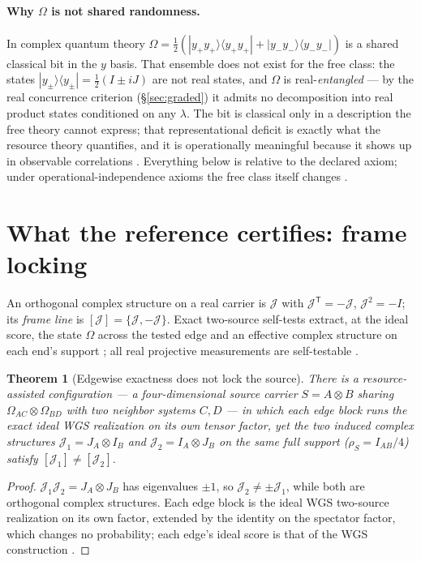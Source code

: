 \documentclass[11pt]{article}
\theoremstyle{plain}
\newtheorem{theorem}{Theorem}[section]
\theoremstyle{definition}
\theoremstyle{remark}
\theoremstyle{plain}
\newcommand{\Om}{\Omega}
\newcommand{\cJ}{\mathcal{J}}
\begin{document}
\paragraph{Why $\Om$ is not shared randomness.} In complex quantum
theory $\Om = \tfrac12(|y_+y_+\rangle\langle y_+y_+| +
|y_-y_-\rangle\langle y_-y_-|)$ is a shared classical bit in the
$y$ basis. That ensemble does not exist for the free class: the
states $|y_\pm\rangle\langle y_\pm| = \tfrac12(I\pm iJ)$ are not
real states, and $\Om$ is real-\emph{entangled} --- by the real
concurrence criterion (\S\ref{sec:graded}) it admits no
decomposition into real product states conditioned on any
$\lambda$. The bit is classical only in a description the free
theory cannot express; that representational deficit is exactly
what the resource theory quantifies, and it is operationally
meaningful because it shows up in observable correlations
\cite{renou2021}. Everything below is relative to the declared
axiom; under operational-independence axioms the free class
itself changes \cite{hoffreumon2026}.

\section{What the reference certifies: frame locking}
\label{sec:lock}

An orthogonal complex structure on a real carrier is $\cJ$ with
$\cJ^{\mathsf T} = -\cJ$, $\cJ^2 = -I$; its \emph{frame line} is
$[\cJ] = \{\cJ,-\cJ\}$. Exact two-source self-tests extract, at
the ideal score, the state $\Om$ across the tested edge and an
effective complex structure on each end's support \cite{wgs2025};
all real projective measurements are self-testable
\cite{supic2024}.

\begin{theorem}[Edgewise exactness does not lock the source]
\label{thm:nolock}
There is a resource-assisted configuration --- a four-dimensional
source carrier $S = A\otimes B$ sharing
$\Om_{AC}\otimes\Om_{BD}$ with two neighbor systems $C,D$ --- in
which each edge block runs the exact ideal WGS realization on its
own tensor factor, yet the two induced complex structures
$\cJ_1 = J_A\otimes I_B$ and $\cJ_2 = I_A\otimes J_B$ on the same
full support ($\rho_S = I_{AB}/4$) satisfy $[\cJ_1]\neq[\cJ_2]$.
\end{theorem}

\begin{proof}
$\cJ_1\cJ_2 = J_A\otimes J_B$ has eigenvalues $\pm1$, so
$\cJ_2\neq\pm\cJ_1$, while both are orthogonal complex structures.
Each edge block is the ideal WGS two-source realization on its own
factor, extended by the identity on the spectator factor, which
changes no probability; each edge's ideal score is that of the WGS
construction \cite{wgs2025}.
\end{proof}
\end{document}
